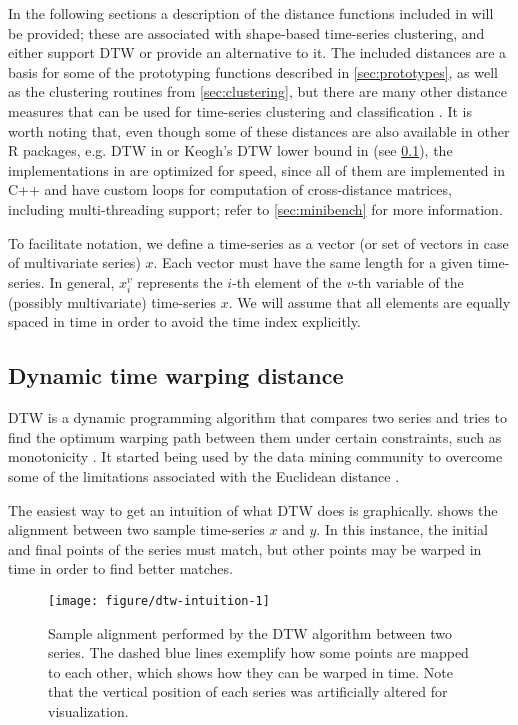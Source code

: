 In the following sections a description of the distance functions included in \dtwclust{} will be provided;
these are associated with shape-based time-series clustering,
and either support DTW or provide an alternative to it.
The included distances are a basis for some of the prototyping functions described in \cref{sec:prototypes},
as well as the clustering routines from \cref{sec:clustering},
but there are many other distance measures that can be used for time-series clustering and classification \citep{montero2014, tsdist}.
It is worth noting that,
even though some of these distances are also available in other R packages,
e.g. DTW in  or Keogh's DTW lower bound in 
(see \cref{sec:dtw}),
the implementations in \dtwclust{} are optimized for speed,
since all of them are implemented in C++ and have custom loops for computation of cross-distance matrices,
including multi-threading support;
refer to \cref{sec:minibench} for more information.

To facilitate notation,
we define a time-series as a vector (or set of vectors in case of multivariate series) $x$.
Each vector must have the same length for a given time-series.
In general, $x^v_i$ represents the $i$-th element of the $v$-th variable of the (possibly multivariate) time-series $x$.
We will assume that all elements are equally spaced in time in order to avoid the time index explicitly.

\subsection{Dynamic time warping distance}
\label{sec:dtw}

DTW is a dynamic programming algorithm that compares two series and tries to find the optimum warping path between them under certain constraints,
such as monotonicity \citep{berndt1994}.
It started being used by the data mining community to overcome some of the limitations associated with the Euclidean distance \citep{keogh2004}.

The easiest way to get an intuition of what DTW does is graphically.
 shows the alignment between two sample time-series $x$ and $y$.
In this instance, the initial and final points of the series must match,
but other points may be warped in time in order to find better matches.

\begin{figure}[htbp]

{\centering \texttt{[image: figure/dtw-intuition-1]}

}

\caption{Sample alignment performed by the DTW algorithm between two series. The dashed blue lines exemplify how some points are mapped to each other, which shows how they can be warped in time. Note that the vertical position of each series was artificially altered for visualization.}\label{fig:dtw-intuition}
\end{figure}


